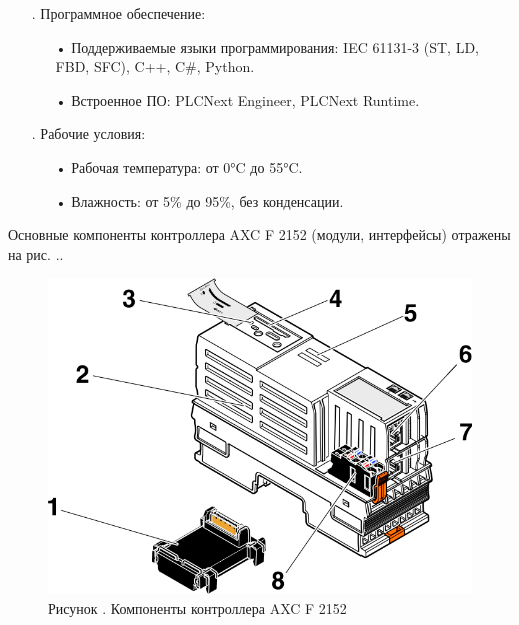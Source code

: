 {\begin{itemize}[leftmargin=2.15cm, labelwidth=0.65cm, labelsep=0.0cm]
		\item[\theitemcntr. ] Программное обеспечение:
			\begin{itemize}[leftmargin=1.5cm, labelwidth=0.65cm, labelsep=0.0cm] 
				\item[•] Поддерживаемые языки программирования: IEC 61131-3 (ST, LD, FBD, SFC), C++, C\#, Python.
				\item[•] Встроенное ПО: PLCNext Engineer, PLCNext Runtime.
			\end{itemize} \addtocounter{itemcntr}{1}

		\item[\theitemcntr. ] Рабочие условия:
			\begin{itemize}[leftmargin=1.5cm, labelwidth=0.65cm, labelsep=0.0cm] 
				\item[•] Рабочая температура: от 0°C до 55°C.
				\item[•] Влажность: от 5\% до 95\%, без конденсации.
			\end{itemize} \addtocounter{itemcntr}{1}

	\end{itemize} \setcounter{itemcntr}{1}

	\par \redline Основные компоненты контроллера AXC F 2152 (модули, интерфейсы) отражены на рис. \thechaptercntr.\theimagecntr. 

	\begin{figure}[H]
		\centering
		\def\svgwidth{\textwidth}
		\includegraphics[scale=1.8]{images/pclnext_complect.png}
		\caption*{\gostFont Рисунок \thechaptercntr .\theimagecntr \spc {--} Компоненты контроллера AXC F 2152}
		\label{fig:PLCComplect}
	\end{figure} \addtocounter{imagecntr}{1}

}
